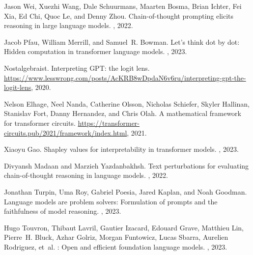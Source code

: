 \documentclass{article}
\begin{document}
\newpage
\begin{thebibliography}{9}

Jason Wei, Xuezhi Wang, Dale Schuurmans, Maarten Bosma, Brian Ichter, Fei Xia,
  Ed Chi, Quoc Le, and Denny Zhou.
\newblock Chain-of-thought prompting elicits reasoning in large language
  models.
, 2022.

Jacob Pfau, William Merrill, and Samuel~R. Bowman.
\newblock Let's think dot by dot: Hidden computation in transformer language
  models.
, 2023.

Nostalgebraist.
\newblock Interpreting {GPT}: the logit lens.
\newblock
  \url{https://www.lesswrong.com/posts/AcKRB8wDpdaN6v6ru/interpreting-gpt-the-logit-lens},
  2020.

Nelson Elhage, Neel Nanda, Catherine Olsson, Nicholas Schiefer, Skyler Hallinan,
  Stanislav Fort, Danny Hernandez, and Chris Olah.
\newblock A mathematical framework for transformer circuits.
\newblock
  \url{https://transformer-circuits.pub/2021/framework/index.html}, 2021.

Xiaoyu Gao.
\newblock Shapley values for interpretability in transformer models.
, 2023.

Divyansh Madaan and Marzieh Yazdanbakhsh.
\newblock Text perturbations for evaluating chain-of-thought reasoning in
  language models.
, 2022.

Jonathan Turpin, Uma Roy, Gabriel Poesia, Jared Kaplan, and Noah Goodman.
\newblock Language models are problem solvers: Formulation of prompts and the
  faithfulness of model reasoning.
, 2023.

Hugo Touvron, Thibaut Lavril, Gautier Izacard, Edouard Grave, Matthieu
  Lin, Pierre~H. Bluck, Azhar Golriz, Morgan Funtowicz, Lucas
  Sbarra, Aurelien Rodriguez, et~al.
: Open and efficient foundation language models.
, 2023.

\end{thebibliography}
\end{document}
